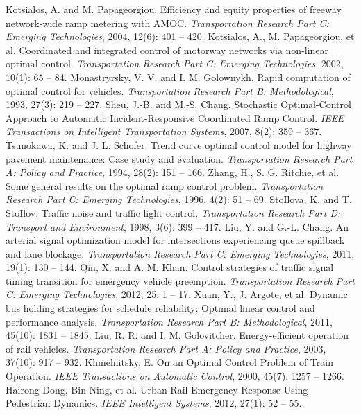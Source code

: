 \documentclass[12pt,onecolumn,twoside]{JCTA}
\theoremstyle{mystyle}
\begin{document}
\begin{thebibliography}{99}
Kotsialos, A. and M. Papageorgiou. Efficiency and equity properties of freeway network-wide ramp metering with AMOC. \textit{Transportation Research Part C: Emerging Technologies}, 2004, 12(6): 401 -- 420.
Kotsialos, A., M. Papageorgiou, et al. Coordinated and integrated control of motorway networks via non-linear optimal control. \textit{Transportation Research Part C: Emerging Technologies}, 2002, 10(1): 65 -- 84.
Monastryrsky, V. V. and I. M. Golownykh. Rapid computation of optimal control for vehicles. \textit{Transportation Research Part B: Methodological}, 1993, 27(3): 219 -- 227.
Sheu, J.-B. and M.-S. Chang. Stochastic Optimal-Control Approach to Automatic Incident-Responsive Coordinated Ramp Control. \textit{IEEE Transactions on Intelligent Transportation Systems}, 2007, 8(2): 359  -- 367.
Tsunokawa, K. and J. L. Schofer. Trend curve optimal control model for highway pavement maintenance: Case study and evaluation. \textit{Transportation Research Part A: Policy and Practice}, 1994, 28(2): 151  -- 166.
Zhang, H., S. G. Ritchie, et al. Some general results on the optimal ramp control problem. \textit{Transportation Research Part C: Emerging Technologies}, 1996, 4(2): 51 -- 69.
StoIlova, K. and T. StoIlov. Traffic noise and traffic light control. \textit{Transportation Research Part D: Transport and Environment}, 1998, 3(6): 399 -- 417.
Liu, Y. and G.-L. Chang. An arterial signal optimization model for intersections experiencing queue spillback and lane blockage. \textit{Transportation Research Part C: Emerging Technologies}, 2011, 19(1): 130 -- 144.
Qin, X. and A. M. Khan. Control strategies of traffic signal timing transition for emergency vehicle preemption. \textit{Transportation Research Part C: Emerging Technologies}, 2012, 25: 1 -- 17.
Xuan, Y., J. Argote, et al. Dynamic bus holding strategies for schedule reliability: Optimal linear control and performance analysis. \textit{Transportation Research Part B: Methodological}, 2011, 45(10): 1831 -- 1845.
Liu, R. R. and I. M. Golovitcher. Energy-efficient operation of rail vehicles. \textit{Transportation Research Part A: Policy and Practice}, 2003, 37(10): 917 -- 932.
Khmelnitsky, E. On an Optimal Control Problem of Train Operation. \textit{IEEE Transactions on Automatic Control}, 2000, 45(7): 1257 -- 1266.
Hairong Dong, Bin Ning, et al. Urban Rail Emergency Response Using Pedestrian Dynamics. \textit{IEEE Intelligent Systems}, 2012, 27(1): 52 -- 55.

\end{thebibliography}
\end{document}
